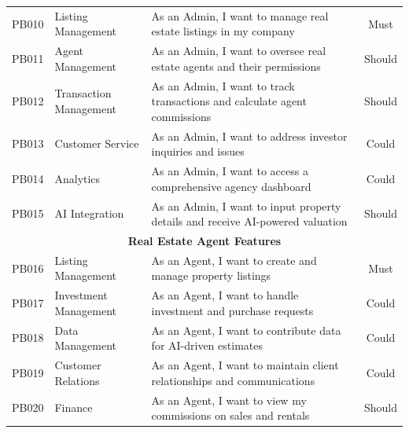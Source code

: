 \begin{longtable}{|c|l|p{8cm}|c|}
    \newpage

    \multicolumn{4}{|c|}{\cellcolor{primary!15}\textbf{\textcolor{primary}{Admin Features}}} \\
    \hline
    PB010 & Listing Management & As an Admin, I want to manage real estate listings in my company & Must \\
    \hline
    PB011 & Agent Management & As an Admin, I want to oversee real estate agents and their permissions & Should \\
    \hline
    PB012 & Transaction Management & As an Admin, I want to track transactions and calculate agent commissions & Should \\
    \hline
    PB013 & Customer Service & As an Admin, I want to address investor inquiries and issues & Could \\
    \hline
    PB014 & Analytics & As an Admin, I want to access a comprehensive agency dashboard & Could \\
    \hline
    PB015 & AI Integration & As an Admin, I want to input property details and receive AI-powered valuation & Should \\
    \hline
    
    \multicolumn{4}{|c|}{\cellcolor{primary!15}\textbf{\textcolor{primary}{Real Estate Agent Features}}} \\
    \hline
    PB016 & Listing Management & As an Agent, I want to create and manage property listings & Must \\
    \hline
    PB017 & Investment Management & As an Agent, I want to handle investment and purchase requests & Could \\
    \hline
    PB018 & Data Management & As an Agent, I want to contribute data for AI-driven estimates & Could \\
    \hline
    PB019 & Customer Relations & As an Agent, I want to maintain client relationships and communications & Could \\
    \hline
    PB020 & Finance & As an Agent, I want to view my commissions on sales and rentals & Should \\
    \hline
    

\end{longtable}
